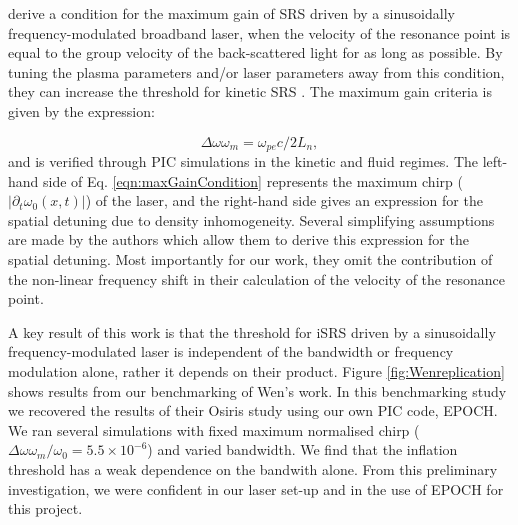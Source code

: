\citet{Wen2021} derive a condition for the maximum gain of SRS driven by a sinusoidally frequency-modulated broadband laser, when the velocity of the resonance point is equal to the group velocity of the back-scattered light for as long as possible. By tuning the plasma parameters and/or laser parameters away from this condition, they can increase the threshold for kinetic SRS \citep{Wen2021}. The maximum gain criteria is given by the expression:

\begin{equation}\label{eqn:maxGainCondition}
 \Delta\omega\omega_m = \omega_{pe}c / 2L_n,
\end{equation} and is verified through PIC simulations in the kinetic and fluid regimes. The left-hand side of Eq. \ref{eqn:maxGainCondition} represents the maximum chirp ($|\partial_t\omega_0(x,t)|$) of the laser, and the right-hand side gives an expression for the spatial detuning due to density inhomogeneity. Several simplifying assumptions are made by the authors which allow them to derive this expression for the spatial detuning. Most importantly for our work, they omit the contribution of the non-linear frequency shift in their calculation of the velocity of the resonance point. 

A key result of this work is that the threshold for iSRS driven by a sinusoidally frequency-modulated laser is independent of the bandwidth or frequency modulation alone, rather it depends on their product. Figure \ref{fig:Wenreplication} shows results from our benchmarking of Wen's work. In this benchmarking study we recovered the results of their Osiris study using our own PIC code, EPOCH. We ran several simulations with fixed maximum normalised chirp ($\Delta\omega \omega_m / \omega_0=5.5\times10^{-6}$) and varied bandwidth. We find that the inflation threshold has a weak dependence on the bandwith alone. From this preliminary investigation, we were confident in our laser set-up and in the use of EPOCH for this project.


